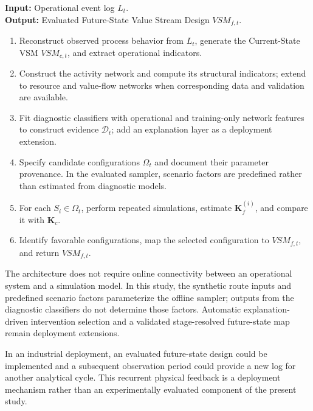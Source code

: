 \documentclass[pdflatex,iicol,Numbered,sn-basic]{sn-jnl}
\begin{document}
\begin{algorithm}[!t]
\caption{Proposed VSM/VSD architecture and deployment extensions}
\label{alg:closed_loop}
\textbf{Input:} Operational event log \(L_t\).\\
\textbf{Output:} Evaluated Future-State Value Stream Design \(VSM_{f,t}\).
\begin{enumerate}
\item Reconstruct observed process behavior from \(L_t\), generate the
Current-State VSM \(VSM_{c,t}\), and extract operational indicators.
\item Construct the activity network and compute its structural indicators; extend to resource and value-flow networks when corresponding data and validation are available.
\item Fit diagnostic classifiers with operational and training-only network features to construct evidence \(\mathcal{D}_t\); add an explanation layer as a deployment extension.
\item Specify candidate configurations \(\Omega_t\) and document their parameter provenance. In the evaluated sampler, scenario factors are predefined rather than estimated from diagnostic models.
\item For each \(S_i\in\Omega_t\), perform repeated simulations, estimate
\(\mathbf{K}_{f}^{(i)}\), and compare it with \(\mathbf{K}_{c}\).
\item Identify favorable configurations, map the selected configuration to
\(VSM_{f,t}\), and return \(VSM_{f,t}\).
\end{enumerate}
\end{algorithm}

The architecture does not require online connectivity between an operational system and a simulation model. In this study, the synthetic route inputs and predefined scenario factors parameterize the offline sampler; outputs from the diagnostic classifiers do not determine those factors. Automatic explanation-driven intervention selection and a validated stage-resolved future-state map remain deployment extensions.

In an industrial deployment, an evaluated future-state design could be implemented and a subsequent observation period could provide a new log for another analytical cycle. This recurrent physical feedback is a deployment mechanism rather than an experimentally evaluated component of the present study.

\end{document}
